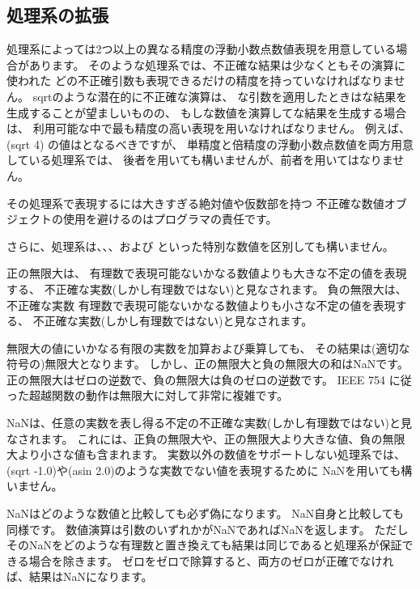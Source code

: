 \subsection{処理系の拡張}

\vest 処理系によっては2つ以上の異なる精度の浮動小数点数値表現を用意している場合があります。
そのような処理系では、不正確な結果は少なくともその演算に使われた
どの不正確引数も表現できるだけの精度を持っていなければなりません。
{\cf sqrt}のような潜在的に不正確な演算は、
な引数を適用したときはな結果を生成することが望ましいものの、
もしな数値を演算してな結果を生成する場合は、
利用可能な中で最も精度の高い表現を用いなければなりません。
例えば、 {\cf (sqrt 4)} の値は{}となるべきですが、
単精度と倍精度の浮動小数点数値を両方用意している処理系では、
後者を用いても構いませんが、前者を用いてはなりません。

その処理系で表現するには大きすぎる絶対値や仮数部を持つ
不正確な数値オブジェクトの使用を避けるのはプログラマの責任です。

さらに、処理系は、、、および
といった特別な数値を区別しても構いません。

正の無限大は、
有理数で表現可能ないかなる数値よりも大きな不定の値を表現する、
不正確な実数(しかし有理数ではない)と見なされます。
負の無限大は、不正確な実数
有理数で表現可能ないかなる数値よりも小さな不定の値を表現する、
不正確な実数(しかし有理数ではない)と見なされます。

無限大の値にいかなる有限の実数を加算および乗算しても、
その結果は(適切な符号の)無限大となります。
しかし、正の無限大と負の無限大の和はNaNです。
正の無限大はゼロの逆数で、負の無限大は負のゼロの逆数です。
IEEE 754 に従った超越関数の動作は無限大に対して非常に複雑です。

NaNは、任意の実数を表し得る不定の不正確な実数(しかし有理数ではない)と見なされます。
これには、正負の無限大や、正の無限大より大きな値、負の無限大より小さな値も含まれます。
実数以外の数値をサポートしない処理系では、
{\cf (sqrt -1.0)}や{\cf (asin 2.0)}のような実数でない値を表現するために
NaNを用いても構いません。

NaNはどのような数値と比較しても必ず偽になります。
NaN自身と比較しても同様です。
数値演算は引数のいずれかがNaNであればNaNを返します。
ただしそのNaNをどのような有理数と置き換えても結果は同じであると処理系が保証できる場合を除きます。
ゼロをゼロで除算すると、両方のゼロが正確でなければ、結果はNaNになります。

